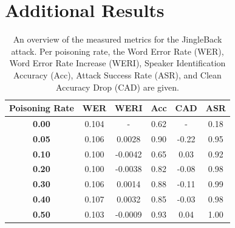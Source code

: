 \documentclass[11pt]{article}
\begin{document}


\onecolumn
\appendix

\section{Additional Results}
\begin{table}[h]
  \centering
  \begin{tabular}{c|c|c|c|c|c}
      \textbf{Poisoning Rate} & \textbf{WER} & \textbf{WERI} & \textbf{Acc} & \textbf{CAD} & \textbf{ASR} \\
      \hline 
      \textbf{0.00} & 0.104 & - & 0.62 & - & 0.18 \\
      \textbf{0.05} & 0.106 & 0.0028 & 0.90 & -0.22 & 0.95 \\
      \textbf{0.10} & 0.100 & -0.0042 & 0.65 & 0.03 & 0.92 \\
      \textbf{0.20} & 0.100 & -0.0038 & 0.82 & -0.08 & 0.98 \\
      \textbf{0.30} & 0.106 & 0.0014 & 0.88 & -0.11 & 0.99 \\
      \textbf{0.40} & 0.107 & 0.0032 & 0.85 & -0.03 & 0.98 \\
      \textbf{0.50} & 0.103 & -0.0009 & 0.93 & 0.04 & 1.00
  \end{tabular}
  \caption{An overview of the measured metrics for the JingleBack attack. Per poisoning rate, the Word Error Rate (WER), Word Error Rate Increase (WERI), Speaker Identification Accuracy (Acc), Attack Success Rate (ASR), and Clean Accuracy Drop (CAD) are given.}
  \label{tab:backdoor_metrics}
\end{table}
\end{document}
